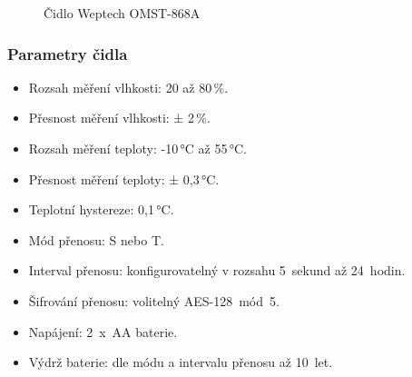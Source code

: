 \begin{figure}[!ht]
\vspace{-5pt}
    \centering
			\hspace*{5mm}
		\caption{Čidlo Weptech OMST-868A~\cite{CidloWeptech}}
		\vspace{-25pt}
\end{figure}

\subsubsection{Parametry čidla}
\begin{itemize}
	\item Rozsah měření vlhkosti: 20 až 80\,\%.
	\item Přesnost měření vlhkosti: ± 2\,\%.
	\item Rozsah měření teploty: -10\,°C až 55\,°C.
	\item Přesnost měření teploty: ± 0,3\,°C.
	\item Teplotní hystereze: 0,1\,°C.
	\item Mód přenosu: S nebo T.
	\item Interval přenosu: konfigurovatelný v rozsahu 5~sekund až 24~hodin.
	\item Šifrování přenosu: volitelný AES-128~mód~5.
	\item Napájení: 2~x~AA baterie.
	\item Výdrž baterie: dle módu a intervalu přenosu až 10~let.
\end{itemize}


